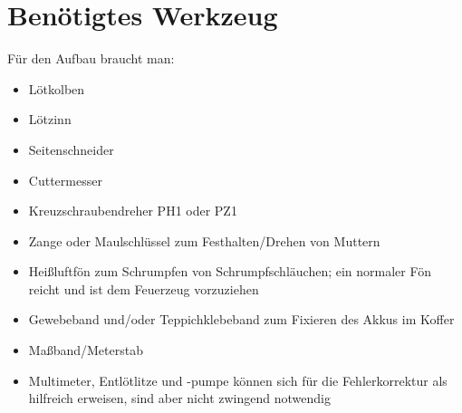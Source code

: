 \documentclass[paper=a4, open=any, numbers=noenddot]{scrbook}
\begin{document}
		\section{Benötigtes Werkzeug}
			Für den Aufbau braucht man:
			\begin{itemize}
				\item
				      Lötkolben
				\item
				      Lötzinn
				\item
				      Seitenschneider
				\item
				      Cuttermesser
				\item
				      Kreuzschraubendreher PH1 oder PZ1
				\item
				      Zange oder Maulschlüssel zum Festhalten/Drehen von Muttern
				\item
				      Heißluftfön zum Schrumpfen von Schrumpfschläuchen; ein normaler Fön reicht und ist dem Feuerzeug vorzuziehen
				\item
				      Gewebeband und/oder Teppichklebeband zum Fixieren des Akkus im Koffer
				\item
				      Maßband/Meterstab
				\item
				      Multimeter, Entlötlitze und -pumpe können sich für die Fehlerkorrektur als hilfreich erweisen, sind aber nicht zwingend notwendig
			\end{itemize}
\end{document}
